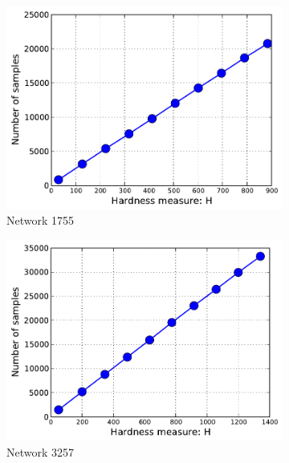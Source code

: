 \documentclass{article}
\begin{document}
\begin{figure}[htbp]
\centering
\begin{subfigure}[c]{\imgsize\textwidth}
	\includegraphics[width=\textwidth]{fig/exp/mst-cs-1755}
	\caption{Network 1755}
\end{subfigure}
\begin{subfigure}[c]{\imgsize\textwidth}
	\includegraphics[width=\textwidth]{fig/exp/mst-cs-3257}
	\caption{Network 3257}
\end{subfigure}
\begin{subfigure}[c]{\imgsize\textwidth}

\end{subfigure}
\end{figure}
\end{document}
